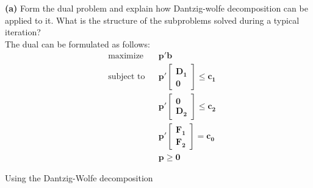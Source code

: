 \documentclass{article}
\begin{document}
\noindent
\textbf{(a)}
Form the dual problem and explain how Dantzig-wolfe decomposition can be applied to it.  What is the structure of the subproblems solved during a typical iteration? \\

\noindent
The dual can be formulated as follows:\\
\begin{equation*}
\begin{aligned}
& \text{maximize} && \mathbf{p'b} \\
& \text{subject to} &&  \mathbf{p'  \begin{bmatrix} \mathbf{D_1} \\\mathbf{0} \end{bmatrix} \leq c_1}
 \\
& &&  \mathbf{p'  \begin{bmatrix} \mathbf{0} \\ \mathbf{D_2} \end{bmatrix} \leq c_2} \\
& &&  \mathbf{p'  \begin{bmatrix} \mathbf{F_1} \\ \mathbf{F_2} \end{bmatrix} = c_0} \\
& & &\mathbf{p \geq 0}
\end{aligned}
\end{equation*}


\noindent
Using the Dantzig-Wolfe decomposition
\end{document}
